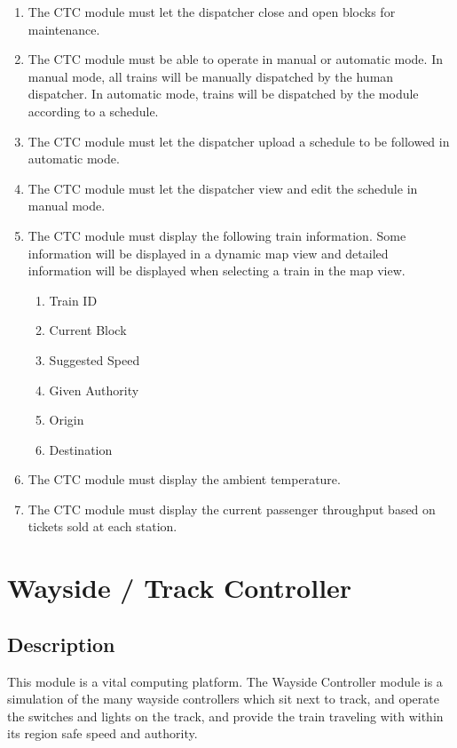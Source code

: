 \documentclass{scrreprt}
\begin{document}
\begin{enumerate}
\begin{enumerate}
    \end{enumerate}
    \item The CTC module must let the dispatcher close and open blocks for maintenance.
    \item The CTC module must be able to operate in manual or automatic mode. In manual
    mode, all trains will be manually dispatched by the human dispatcher. In automatic
    mode, trains will be dispatched by the module according to a schedule.
    \item The CTC module must let the dispatcher upload a schedule to be followed in
    automatic mode.
    \item The CTC module must let the dispatcher view and edit the schedule in manual mode.
    \item The CTC module must display the following train information. Some information
    will be displayed in a dynamic map view and detailed information will be displayed
    when selecting a train in the map view.
    \begin{enumerate}
        \item Train ID
        \item Current Block
        \item Suggested Speed
        \item Given Authority
        \item Origin
        \item Destination
    \end{enumerate}
    \item The CTC module must display the ambient temperature.
    \item The CTC module must display the current passenger throughput based on tickets
    sold at each station.
\end{enumerate}


\section{Wayside / Track Controller}

\subsection{Description}
This module is a vital computing platform.
The Wayside Controller module is a simulation of the many wayside controllers which sit next to track, and operate the switches and lights on the track, and provide the train traveling with within its region safe speed and authority.
\end{document}
